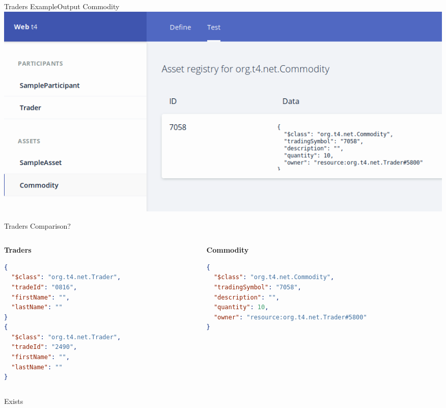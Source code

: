 \documentclass[pdf,table]{beamer}
\begin{document}
\begin{frame}{Traders Example}{Output Commodity}
	\includegraphics[scale=0.35]{t4-Commodity}
\end{frame}

\begin{frame}[fragile]{Traders Comparison?}
	\begin{columns}[T]
		\begin{column}{0.40\textwidth}
			{\bf Traders}	
			\begin{lstlisting}[language=json]
{
  "$class": "org.t4.net.Trader",
  "tradeId": "0816",
  "firstName": "",
  "lastName": ""
}		
{
  "$class": "org.t4.net.Trader",
  "tradeId": "2490",
  "firstName": "",
  "lastName": ""
}
			\end{lstlisting}
		\end{column}

		\begin{column}{0.58\textwidth}
			{\bf Commodity}
			\begin{lstlisting}[language=json]
{
  "$class": "org.t4.net.Commodity",
  "tradingSymbol": "7058",
  "description": "",
  "quantity": 10,
  "owner": "resource:org.t4.net.Trader#5800"
}
			\end{lstlisting}

		\end{column}
	\end{columns}	
\end{frame}

\begin{frame}{Exists}
	
\end{frame}
\end{document}
